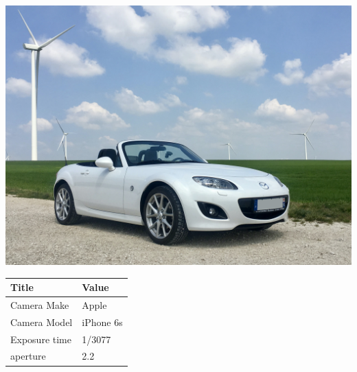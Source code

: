 \documentclass[twocolumn]{article}
\begin{document}
\begin{center}
\includegraphics[width=0.7\columnwidth]{Image2}
\newline
\newline
\newline
\newline
\newline

\begin{tabular}{| m{3cm} | m{3cm} |}
\hline

Title  &  Value   \\

\hline
Camera Make  & Apple   \\
\hline
Camera Model  & iPhone 6s   \\
\hline
Exposure time  & 1/3077  \\
\hline
aperture & 2.2 \\
\hline

\end{tabular}


\end{center}

\newpage
\end{document}
